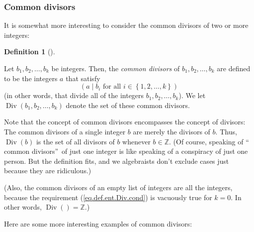 \documentclass[numbers=enddot,12pt,final,onecolumn,notitlepage]{scrartcl}%
\numberwithin{exer}{subsection}
\theoremstyle{definition}
\newtheorem{defi}[theo]{Definition}
\newenvironment{definition}[1][]
{\begin{defi}[#1]\begin{leftbar}}
{\end{leftbar}\end{defi}}
\begin{document}
\subsubsection{Common divisors}

It is somewhat more interesting to consider the common divisors of two or more integers:

\begin{definition}
\label{def.ent.Div}Let $b_{1},b_{2},\ldots,b_{k}$ be integers. Then, the
\textit{common divisors} of $b_{1},b_{2},\ldots,b_{k}$ are defined to be the
integers $a$ that satisfy%
\begin{equation}
\left(  a\mid b_{i}\text{ for all }i\in\left\{  1,2,\ldots,k\right\}  \right)
\label{eq.def.ent.Div.cond}%
\end{equation}
(in other words, that divide all of the integers $b_{1},b_{2},\ldots,b_{k}$).
We let $\operatorname*{Div}\left(  b_{1},b_{2},\ldots,b_{k}\right)  $ denote
the set of these common divisors.
\end{definition}

Note that the concept of common divisors encompasses the concept of divisors:
The common divisors of a single integer $b$ are merely the divisors of $b$.
Thus, $\operatorname*{Div}\left(  b\right)  $ is the set of all divisors of
$b$ whenever $b\in\mathbb{Z}$. (Of course, speaking of \textquotedblleft
common divisors\textquotedblright\ of just one integer is like speaking of a
conspiracy of just one person. But the definition fits, and we algebraists
don't exclude cases just because they are ridiculous.)

(Also, the common divisors of an empty list of integers are all the integers,
because the requirement (\ref{eq.def.ent.Div.cond}) is vacuously true for
$k=0$. In other words, $\operatorname*{Div}\left(  {}\right)  =\mathbb{Z}$.)

Here are some more interesting examples of common divisors:
\end{document}
